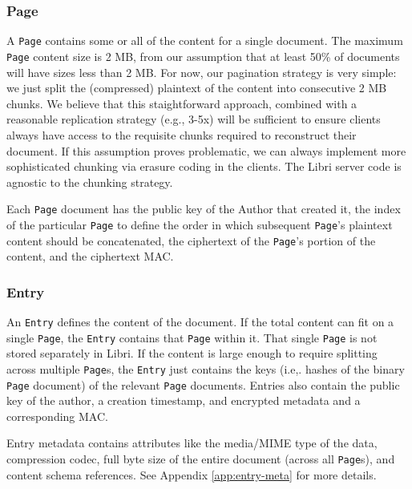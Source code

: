 \documentclass[10pt]{article}
\newcommand{\ttt}[1]{\texttt{#1}}
\def\Entry{\ttt{Entry}}
\def\Page{\ttt{Page}}
\begin{document}
\subsubsection{Page}
A \Page{} contains some or all of the content for a single document. The maximum \Page {} content size is 2 MB, from our assumption that at least 50\% of documents will have sizes less than 2 MB. For now, our pagination strategy is very simple: we just split the (compressed) plaintext of the content into consecutive 2 MB chunks. We believe that this staightforward approach, combined with a reasonable replication strategy (e.g., 3-5x) will be sufficient to ensure clients always have access to the requisite chunks required to reconstruct their document. If this assumption proves problematic, we can always implement more sophisticated chunking via erasure coding in the clients. The Libri server code is agnostic to the chunking strategy.

Each \Page{} document has the public key of the Author that created it, the index of the particular \Page{} to define the order in which subsequent \Page{}'s plaintext content should be concatenated, the ciphertext of the \Page{}'s portion of the content, and the ciphertext MAC. 

\subsubsection{Entry}
An \Entry{} defines the content of the document. If the total content can fit on a single \Page{}, the \Entry{} contains that \Page{} within it. That single \Page{} is not stored separately in Libri. If the content is large enough to require splitting across multiple \Page{}s, the \Entry{} just contains the keys (i.e,. hashes of the binary \Page{} document) of the relevant \Page{} documents. Entries also contain the public key of the author, a creation timestamp, and encrypted metadata and a corresponding MAC. 

Entry metadata contains attributes like the media/MIME type of the data, compression codec, full byte size of the entire document (across all \Page{}s), and content schema references. See Appendix \ref{app:entry-meta} for more details. 
\end{document}
